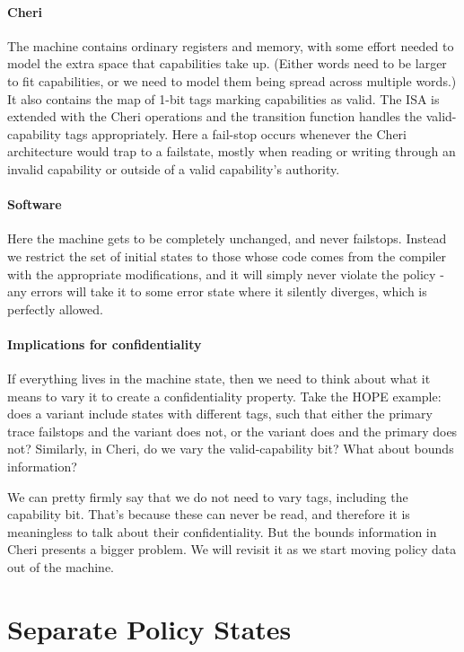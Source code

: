 \documentclass{article}
\begin{document}
\paragraph*{Cheri} The machine contains ordinary registers and memory, with some effort needed
to model the extra space that capabilities take up. (Either words need to be larger to fit
capabilities, or we need to model them being spread across multiple words.) It also contains
the map of 1-bit tags marking capabilities as valid. The ISA is extended with the Cheri
operations and the transition function handles the valid-capability tags appropriately.
Here a fail-stop occurs whenever the Cheri architecture would trap to a failstate, mostly
when reading or writing through an invalid capability or outside of a valid capability's
authority.

\paragraph*{Software} Here the machine gets to be completely unchanged, and never failstops.
Instead we restrict the set of initial states to those whose code comes from the compiler
with the appropriate modifications, and it will simply never violate the policy - any errors
will take it to some error state where it silently diverges, which is perfectly allowed.

\paragraph*{Implications for confidentiality} If everything lives in the machine state, then
we need to think about what it means to vary it to create a confidentiality property. Take
the HOPE example: does a variant include states with different tags, such that either the
primary trace failstops and the variant does not, or the variant does and the primary does
not? Similarly, in Cheri, do we vary the valid-capability bit? What about bounds information?

We can pretty firmly say that we do not need to vary tags, including the capability bit. That's
because these can never be read, and therefore it is meaningless to talk about their
confidentiality. But the bounds information in Cheri presents a bigger problem. We will
revisit it as we start moving policy data out of the machine.

\section{Separate Policy States}
\end{document}
